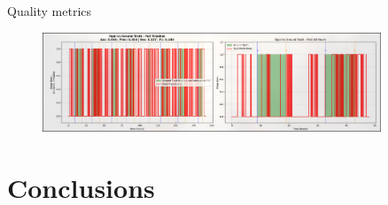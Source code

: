\documentclass[10pt]{beamer} %
\begin{document}
\begin{frame}{Quality metrics}
        \begin{figure}
      
        \includegraphics[width=0.9\textwidth]{figures/opalvsGReal.png} %
        \end{figure}
\end{frame}

\section{Conclusions}
\end{document}
